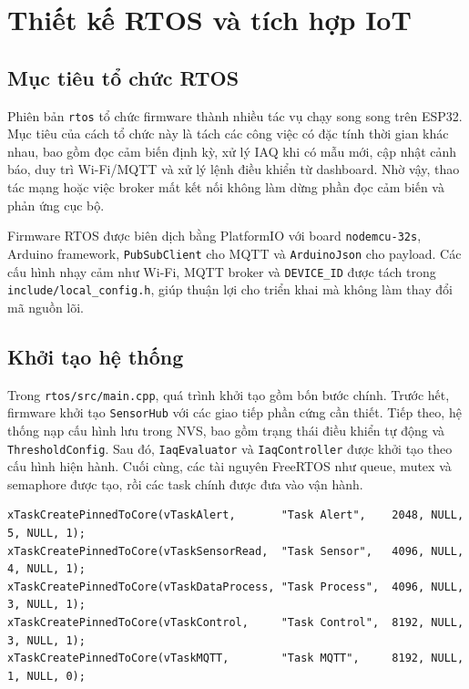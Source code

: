 \section{Thiết kế RTOS và tích hợp IoT}

\subsection{Mục tiêu tổ chức RTOS}

Phiên bản \texttt{rtos} tổ chức firmware thành nhiều tác vụ chạy song song trên ESP32.
Mục tiêu của cách tổ chức này là tách các công việc có đặc tính thời gian khác nhau, bao
gồm đọc cảm biến định kỳ, xử lý IAQ khi có mẫu mới, cập nhật cảnh báo, duy trì Wi-Fi/MQTT
và xử lý lệnh điều khiển từ dashboard. Nhờ vậy, thao tác mạng hoặc việc broker mất kết
nối không làm dừng phần đọc cảm biến và phản ứng cục bộ.

Firmware RTOS được biên dịch bằng PlatformIO với board \texttt{nodemcu-32s}, Arduino
framework, \texttt{PubSubClient} cho MQTT và \texttt{ArduinoJson} cho payload. Các cấu
hình nhạy cảm như Wi-Fi, MQTT broker và \texttt{DEVICE\_ID} được tách trong
\texttt{include/local\_config.h}, giúp thuận lợi cho triển khai mà không làm thay đổi mã
nguồn lõi.

\subsection{Khởi tạo hệ thống}

Trong \texttt{rtos/src/main.cpp}, quá trình khởi tạo gồm bốn bước chính. Trước hết,
firmware khởi tạo \texttt{SensorHub} với các giao tiếp phần cứng cần thiết. Tiếp theo,
hệ thống nạp cấu hình lưu trong NVS, bao gồm trạng thái điều khiển tự động và
\texttt{ThresholdConfig}. Sau đó, \texttt{IaqEvaluator} và \texttt{IaqController} được
khởi tạo theo cấu hình hiện hành. Cuối cùng, các tài nguyên FreeRTOS như queue, mutex và
semaphore được tạo, rồi các task chính được đưa vào vận hành.

\begin{lstlisting}[style=engineering,basicstyle=\ttfamily\footnotesize,columns=fullflexible,caption={Các task chính trong phiên bản RTOS}]
xTaskCreatePinnedToCore(vTaskAlert,       "Task Alert",    2048, NULL, 5, NULL, 1);
xTaskCreatePinnedToCore(vTaskSensorRead,  "Task Sensor",   4096, NULL, 4, NULL, 1);
xTaskCreatePinnedToCore(vTaskDataProcess, "Task Process",  4096, NULL, 3, NULL, 1);
xTaskCreatePinnedToCore(vTaskControl,     "Task Control",  8192, NULL, 3, NULL, 1);
xTaskCreatePinnedToCore(vTaskMQTT,        "Task MQTT",     8192, NULL, 1, NULL, 0);
\end{lstlisting}

